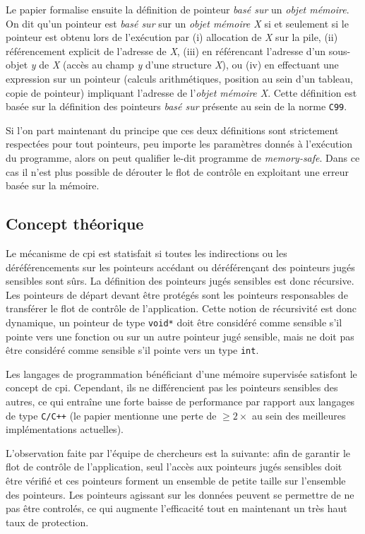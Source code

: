 Le papier formalise ensuite la définition de pointeur \textit{basé sur} un \textit{objet mémoire}. On dit qu'un pointeur est \textit{basé sur} sur un \textit{objet mémoire X} si et seulement si le pointeur est obtenu lors de l'exécution par (i) allocation de \textit{X} sur la pile, (ii) référencement explicit de l'adresse de \textit{X}, (iii) en référencant l'adresse d'un sous-objet \textit{y} de \textit{X} (accès au champ \textit{y} d'une structure \textit{X}), ou (iv) en effectuant une expression sur un pointeur (calculs arithmétiques, position au sein d'un tableau, copie de pointeur) impliquant l'adresse de l'\textit{objet mémoire X}. Cette définition est basée sur la définition des pointeurs \textit{basé sur} présente au sein de la norme \texttt{C99}.

\newpage

Si l'on part maintenant du principe que ces deux définitions sont strictement respectées pour tout pointeurs, peu importe les paramètres donnés à l'exécution du programme, alors on peut qualifier le-dit programme de \textit{memory-safe}. Dans ce cas il n'est plus possible de dérouter le flot de contrôle en exploitant une erreur basée sur la mémoire.

\subsection{Concept théorique}

Le mécanisme de \gls{cpi} est statisfait si toutes les indirections ou les déréférencements sur les pointeurs accédant ou déréférençant des pointeurs jugés \og sensibles \fg sont sûrs. La définition des pointeurs jugés sensibles est donc récursive. Les pointeurs de départ devant être protégés sont les pointeurs responsables de transférer le flot de contrôle de l'application. Cette notion de récursivité est donc dynamique, un pointeur de type \texttt{void*} doit être considéré comme sensible s'il pointe vers une fonction ou sur un autre pointeur jugé sensible, mais ne doit pas être considéré comme sensible s'il pointe vers un type \texttt{int}.

Les langages de programmation bénéficiant d'une mémoire supervisée satisfont le concept de \gls{cpi}. Cependant, ils ne différencient pas les pointeurs sensibles des autres, ce qui entraîne une forte baisse de performance par rapport aux langages de type \texttt{C/C++} (le papier mentionne une perte de $\geq2\times$ au sein des meilleures implémentations actuelles).

L'observation faite par l'équipe de chercheurs est la suivante: afin de garantir le flot de contrôle de l'application, seul l'accès aux pointeurs jugés sensibles doit être vérifié et ces pointeurs forment un ensemble de petite taille sur l'ensemble des pointeurs. Les pointeurs agissant sur les données peuvent se permettre de ne pas être controlés, ce qui augmente l'efficacité tout en maintenant un très haut taux de protection.


